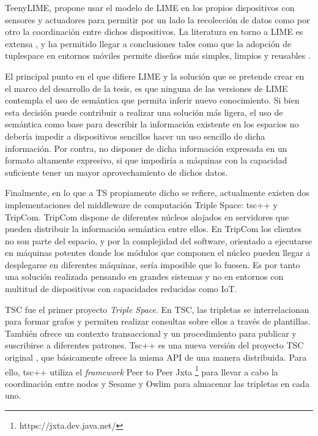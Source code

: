 TeenyLIME\cite{costa_teenylime:_2006}, propone usar el modelo de LIME en los propios dispositivos con sensores y actuadores para permitir por un lado la recolección de datos como por otro la coordinación entre dichos dispositivos. La literatura en torno a LIME es extensa \cite{picco_understanding_1998,murphy_enabling_2000,picco_lime:_1999,picco_developing_2000,murphy_lime:_2001,picco_exploiting_2002,handorean_service_2002,handorean_coordination_2003,murphy_using_2004,curino_tinylime:_2005,murphy_transiently_2006,curino_mobile_2005,murphy_using_2006,murphy_lime:_2006,costa_teenylime:_2006,costa_programming_2007,ceriotti_monitoring_2009,ceriotti_is_2011}, y ha permitido llegar a conclusiones tales como que la adopción de tuplespace en entornos móviles permite diseños más simples, limpios y reusables \cite{curino_tinylime:_2005}.

El principal punto en el que difiere LIME y la solución que se pretende crear en el marco del desarrollo de la tesis, es que ninguna de las versiones de LIME contempla el uso de semántica que permita inferir nuevo conocimiento. Si bien esta decisión puede contribuir a realizar una solución más ligera, el uso de semántica como base para describir la información existente en los espacios no debería impedir a dispositivos sencillos hacer un uso sencillo de dicha información. Por contra, no disponer de dicha información expresada en un formato altamente expresivo, si que impediría a máquinas con la capacidad suficiente tener un mayor aprovechamiento de dichos datos.

Finalmente, en lo que a TS propiamente dicho se refiere, actualmente existen dos implementaciones del middleware de computación Triple Space: tsc++ y TripCom. TripCom\cite{tripcom_2011} dispone de diferentes núcleos alojados en servidores que pueden distribuir la información semántica entre ellos. En TripCom los clientes no son parte del espacio, y por la complejidad del software, orientado a ejecutarse en máquinas potentes donde los módulos que componen el núcleo pueden llegar a desplegarse en diferentes máquinas, sería imposible que lo fuesen. Es por tanto una solución realizada pensando en grandes sistemas y no en entornos con multitud de dispositivos con capacidades reducidas como IoT.

TSC fue el primer proyecto \textit{Triple Space}. En TSC, las tripletas se interrelacionan para formar grafos y permiten realizar consultas sobre ellos a través de plantillas. También ofrece un contexto transaccional y un procedimiento para publicar y suscribirse a diferentes patrones. Tsc++ \cite{krummenacher_open_2009} es una nueva versión del proyecto TSC original \cite{fensel_triple-space_2004}, que básicamente ofrece la misma API de una manera distribuida. Para ello, tsc++ utiliza el \textit{framework} Peer to Peer Jxta \footnote{https://jxta.dev.java.net/} para llevar a cabo la coordinación entre nodos y Sesame \cite{broekstra_sesame:_2002} y Owlim \cite{kiryakov_owlimpragmatic_2005} para almacenar las tripletas en cada uno.

